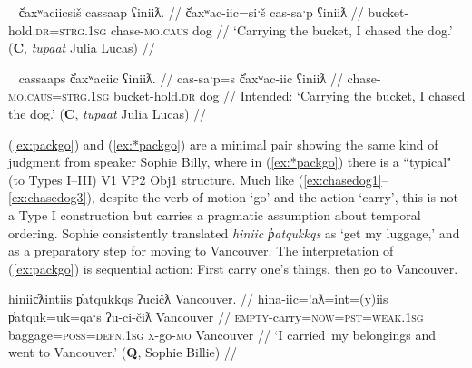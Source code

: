 \ex~ \label{ex:chasedog2}
\begingl
\glpreamble č̓axʷaciicsiš cassaap ʕiniiƛ. //
\gla č̓axʷac-iic=siˑš cas-saˑp ʕiniiƛ //
\glb bucket-hold.\textsc{dr}=\textsc{strg.1sg} chase-\textsc{mo.caus} dog //
\glft `Carrying the bucket, I chased the dog.' (\textbf{C}, \textit{tupaat} Julia Lucas) //
\endgl
\xe

\ex~ \label{ex:chasedog3}
\begingl
\glpreamble *cassaaps č̓axʷaciic ʕiniiƛ. //
\gla cas-saˑp=s č̓axʷac-iic ʕiniiƛ //
\glb chase-\textsc{mo.caus}=\textsc{strg.1sg} bucket-hold.\textsc{dr} dog //
\glft Intended: `Carrying the bucket, I chased the dog.' (\textbf{C}, \textit{tupaat} Julia Lucas) //
\endgl
\xe


(\ref{ex:packgo}) and (\ref{ex:*packgo}) are a minimal pair showing the same kind of judgment from speaker Sophie Billy, where in (\ref{ex:*packgo}) there is a ``typical" (to Types I--III) V1 VP2 Obj1 structure. Much like (\ref{ex:chasedog1}--\ref{ex:chasedog3}), despite the verb of motion `go' and the action `carry', this is not a Type I construction but carries a pragmatic assumption about temporal ordering. Sophie consistently translated \textit{hiniic p̓atqukkqs} as `get my luggage,' and as a preparatory step for moving to Vancouver. The interpretation of (\ref{ex:packgo}) is sequential action: First carry one's things, then go to Vancouver.

\ex \label{ex:packgo}
\begingl
\glpreamble hiniic̓ƛintiis p̓atqukkqs ʔucičƛ Vancouver. //
\gla hina-iic=!aƛ=int=(y)iis p̓atquk=uk=qaˑs ʔu-ci-čiƛ Vancouver //
\glb \textsc{empty}-carry=\textsc{now}=\textsc{pst}=\textsc{weak.1sg} baggage=\textsc{poss}=\textsc{defn.1sg} \textsc{x}-go-\textsc{mo} Vancouver //
\glft `I carried\footnotemark\ my belongings and went to Vancouver.' (\textbf{Q}, Sophie Billie) //
\endgl
\xe


